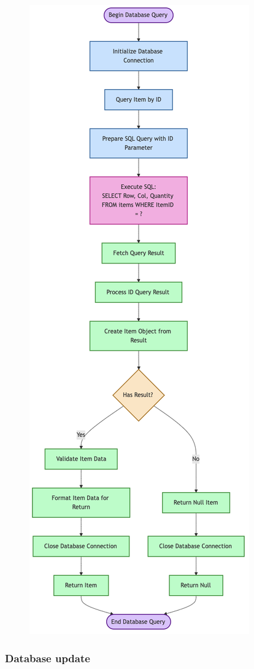 \begin{figure}[htbp]
    \centering
    \includegraphics[width=0.4\linewidth]{Flowcharts/dbquery.png}
\end{figure}

\newpage

\subsubsection{Database update}

